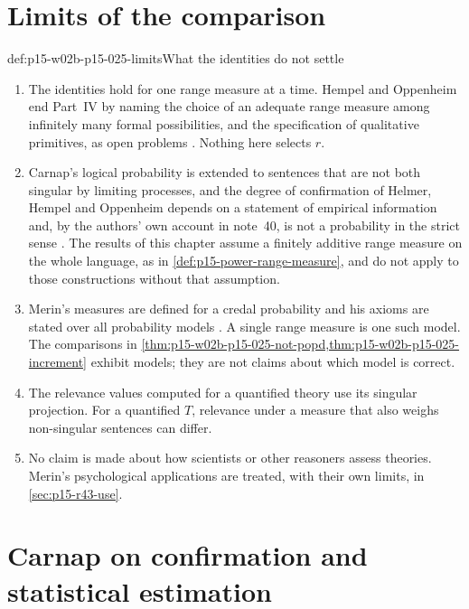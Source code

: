 \section{Limits of the comparison}
\label{sec:p15-w02b-p15-025-limits}

\begin{hbwarning}{def:p15-w02b-p15-025-limits}{What the identities do not settle}
\begin{enumerate}
\item The identities hold for one range measure at a time. Hempel and
Oppenheim end Part~IV by naming the choice of an adequate range measure
among infinitely many formal possibilities, and the specification of
qualitative primitives, as open problems
\cite[p.~173]{HempelOppenheim1948Explanation}. Nothing here selects
\(r\).
\item Carnap's logical probability is extended to sentences that are not
both singular by limiting processes, and the degree of confirmation of
Helmer, Hempel and Oppenheim depends on a statement of empirical
information and, by the authors' own account in note~40, is not a
probability in the strict sense
\cite[pp.~170--171, nn.~38, 40]{HempelOppenheim1948Explanation}. The
results of this chapter assume a finitely additive range measure on the
whole language, as in \cref{def:p15-power-range-measure}, and do not
apply to those constructions without that assumption.
\item Merin's measures are defined for a credal probability and his
axioms are stated over all probability models
\cite[pp.~269--271]{Merin2021Relevance}. A single range measure is one
such model. The comparisons in
\cref{thm:p15-w02b-p15-025-not-popd,thm:p15-w02b-p15-025-increment}
exhibit models; they are not claims about which model is correct.
\item The relevance values computed for a quantified theory use its
singular projection. For a quantified \(T\), relevance under a measure
that also weighs non-singular sentences can differ.
\item No claim is made about how scientists or other reasoners assess
theories. Merin's psychological applications are treated, with their
own limits, in \cref{sec:p15-r43-use}.
\end{enumerate}
\end{hbwarning}

\section{Carnap on confirmation and statistical estimation}
\label{sec:p15-w02b-p15-025-carnap98}

